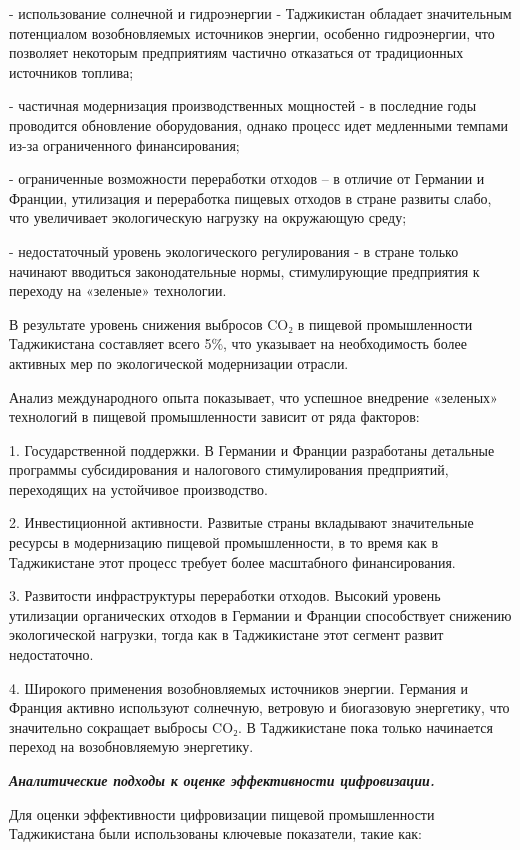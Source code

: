 \begin{multicols}{2}
- использование солнечной и гидроэнергии - Таджикистан обладает
значительным потенциалом возобновляемых источников энергии, особенно
гидроэнергии, что позволяет некоторым предприятиям частично отказаться
от традиционных источников топлива;

- частичная модернизация производственных мощностей - в последние годы
проводится обновление оборудования, однако процесс идет медленными
темпами из-за ограниченного финансирования;

- ограниченные возможности переработки отходов -- в отличие от Германии
и Франции, утилизация и переработка пищевых отходов в стране развиты
слабо, что увеличивает экологическую нагрузку на окружающую среду;

- недостаточный уровень экологического регулирования - в стране только
начинают вводиться законодательные нормы, стимулирующие предприятия к
переходу на «зеленые» технологии.

В результате уровень снижения выбросов CO₂ в пищевой промышленности
Таджикистана составляет всего 5\%, что указывает на необходимость более
активных мер по экологической модернизации отрасли.

Анализ международного опыта показывает, что успешное внедрение «зеленых»
технологий в пищевой промышленности зависит от ряда факторов:

1. Государственной поддержки. В Германии и Франции разработаны детальные
программы субсидирования и налогового стимулирования предприятий,
переходящих на устойчивое производство.

2. Инвестиционной активности. Развитые страны вкладывают значительные
ресурсы в модернизацию пищевой промышленности, в то время как в
Таджикистане этот процесс требует более масштабного финансирования.

3. Развитости инфраструктуры переработки отходов. Высокий уровень
утилизации органических отходов в Германии и Франции способствует
снижению экологической нагрузки, тогда как в Таджикистане этот сегмент
развит недостаточно.

4. Широкого применения возобновляемых источников энергии. Германия и
Франция активно используют солнечную, ветровую и биогазовую
энергетику, что значительно сокращает выбросы CO₂. В Таджикистане пока
только начинается переход на возобновляемую энергетику.

\emph{{\bfseries Аналитические подходы к оценке эффективности
цифровизации.}}

Для оценки эффективности цифровизации пищевой промышленности
Таджикистана были использованы ключевые показатели, такие как:


\end{multicols}
